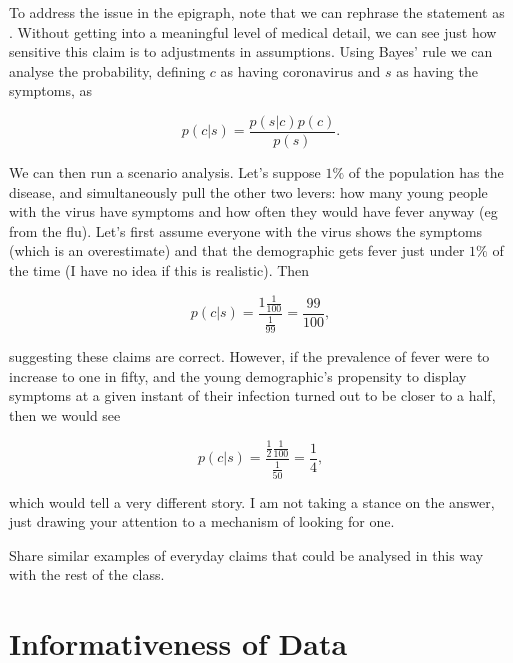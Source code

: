 \documentclass{article}
\begin{document}
To address the issue in the epigraph, note that we can rephrase the statement as . Without getting into a meaningful level of medical detail, we can see just how sensitive this claim is to adjustments in assumptions. Using Bayes' rule we can analyse the probability, defining $c$ as having coronavirus and $s$ as having the symptoms, as

\begin{equation}
    p(c|s)=\frac{p(s|c)p(c)}{p(s)}.
\end{equation}

We can then run a scenario analysis. Let's suppose $1\%$ of the population has the disease, and simultaneously pull the other two levers: how many young people with the virus have symptoms and how often they would have fever anyway (eg from the flu). Let's first assume everyone with the virus shows the symptoms (which is an overestimate) and that the demographic gets fever just under $1\%$ of the time (I have no idea if this is realistic). Then 

\begin{equation}
    p(c|s)=\frac{1 \frac{1}{100}}{\frac{1}{99}}=\frac{99}{100},
\end{equation}

suggesting these claims are correct. However, if the prevalence of fever were to increase to one in fifty, and the young demographic's propensity to display symptoms at a given instant of their infection turned out to be closer to a half, then we would see

\begin{equation}
    p(c|s)=\frac{\frac{1}{2}\frac{1}{100}}{\frac{1}{50}}=\frac{1}{4},
\end{equation}

which would tell a very different story. I am not taking a stance on the answer, just drawing your attention to a mechanism of looking for one.

\begin{Exercise}
    Share similar examples of everyday claims that could be analysed in this way with the rest of the class.
\end{Exercise}


\section{Informativeness of Data}
\end{document}
